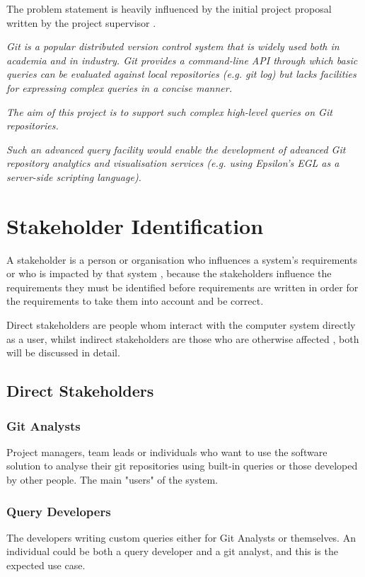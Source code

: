 \documentclass[11pt]{book}
\begin{document}
The problem statement is heavily influenced by the initial project proposal written by the project supervisor \cite{initialproposal}.

\textit{
Git is a popular distributed version control system 	that is widely used both in academia and in industry. Git provides a command-line API through which basic queries can be evaluated against local repositories (e.g. git log) but lacks facilities for expressing complex queries in a concise manner.}

\textit{
The aim of this project is to support such complex high-level queries on Git repositories.}

\textit{
Such an advanced query facility would enable the development of advanced Git repository analytics and visualisation services (e.g. using Epsilon's EGL as a server-side scripting language).}

\section{Stakeholder Identification}
\label{stakeholders}
A stakeholder is a person or organisation who influences a system’s requirements or who is impacted by that system \cite{stakeholders}, because the stakeholders influence the requirements they must be identified before requirements are written in order for the requirements to take them into account and be correct.

Direct stakeholders are people whom interact with the computer system directly as a user, whilst indirect stakeholders are those who are otherwise affected \cite{directvsindirectstakeholders}, both will be discussed in detail.

\subsection{Direct Stakeholders}
\label{directstakeholders}
\subsubsection{Git Analysts}
Project managers, team leads or individuals who want to use the software solution to analyse their git repositories using built-in queries or those developed by other people. The main "users" of the system.

\subsubsection{Query Developers}
The developers writing custom queries either for Git Analysts or themselves. An individual could be both a query developer and a git analyst, and this is the expected use case. 
\end{document}
